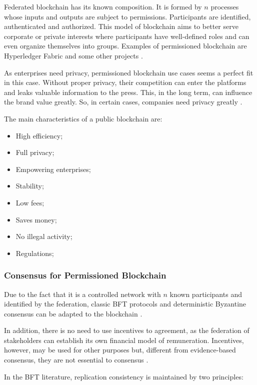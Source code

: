 Federated blockchain has its known composition. It is formed by $n$ processes whose inputs and outputs are subject to permissions. Participants are identified, authenticated and authorized. This model of blockchain aims to better serve corporate or private interests where participants have well-defined roles and can even organize themselves into groups. Examples of permissioned blockchain are Hyperledger Fabric \cite{cachin2016architecture} and some other projects \cite{cachin2017blockchain}.

As enterprises need privacy, permissioned blockchain use cases seems a perfect fit in this case. Without proper privacy, their competition can enter the platforms and leaks valuable information to the press. This, in the long term, can influence the brand value greatly. So, in certain cases, companies need privacy greatly \cite{101blockchains}.

The main characteristics of a public blockchain are:

\begin{itemize}
\item High efficiency;
\item Full privacy;
\item Empowering enterprises;
\item Stability;
\item Low fees;
\item Saves money;
\item No illegal activity;
\item Regulations;
\end{itemize}

\subsubsection{Consensus for Permissioned Blockchain}\label{sec:consensoPrivada}
Due to the fact that it is a controlled network with $n$ known participants and identified by the federation, classic \acf{BFT} protocols and deterministic Byzantine consensus can be adapted to the blockchain \cite{androulaki2018hyperledger}.

In addition, there is no need to use incentives to agreement, as the federation of stakeholders can establish its own financial model of remuneration. Incentives, however, may be used for other purposes but, different from evidence-based consensus, they are not essential to consensus \cite{greve2018blockchain}.

In the \ac{BFT} literature, replication consistency is maintained by two principles:

